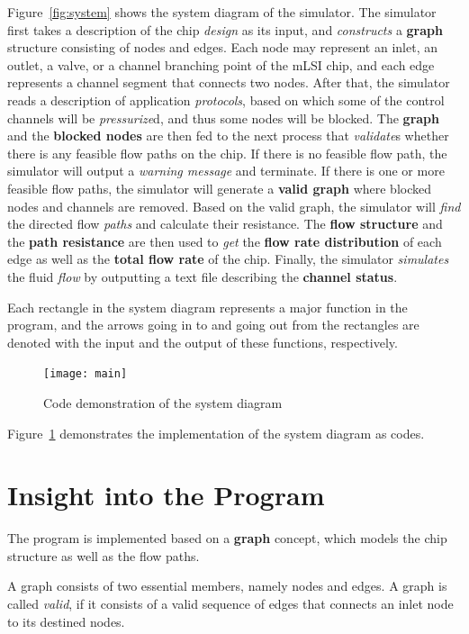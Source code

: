 \documentclass{article}
\begin{document}
Figure~\ref{fig:system} shows the system diagram of the simulator. 
The simulator first takes a description of the chip \textit{design} as its input, and \textit{constructs} a \textbf{graph} structure consisting of nodes and edges. Each node may represent an inlet, an outlet, a valve, or a channel branching point of the mLSI chip, and each edge represents a channel segment that connects two nodes.
After that, the simulator reads a description of application \textit{protocols},
based on which some of the control channels will be \textit{pressurize}d,
and thus some nodes will be blocked.
The \textbf{graph} and the \textbf{blocked nodes} are then fed to the next process that \textit{validate}s whether there is any feasible flow paths on the chip.
If there is no feasible flow path, the simulator will output a \textit{warning message} and terminate. If there is one or more feasible flow paths, the simulator will generate a \textbf{valid graph} where blocked nodes and channels are removed.
Based on the valid graph, the simulator will \textit{find} the directed flow \textit{paths} and calculate their resistance. The \textbf{flow structure } and the \textbf{path resistance} are then used to \textit{get} the \textbf{flow rate distribution} of each edge as well as the \textbf{total flow rate} of the chip. Finally, the simulator \textit{simulates} the fluid \textit{flow} by outputting a text file describing the \textbf{channel status}.

Each rectangle in the system diagram represents a major function in the program, and the arrows going in to and going out from the rectangles are denoted with the input and the output of these functions, respectively.

\begin{figure}
\caption{Code demonstration of the system diagram}
\texttt{[image: main]}
\label{fig:code_main}
\end{figure}

Figure~\ref{fig:code_main} demonstrates the implementation of the system diagram as codes.

\section{Insight into the Program}

The program is implemented based on a \textbf{graph} concept,
which models the chip structure as well as the flow paths.

A graph consists of two essential members, namely nodes and edges. A graph is called \textit{valid}, if it consists of a valid sequence of edges that connects an inlet node to its destined nodes.
\end{document}
